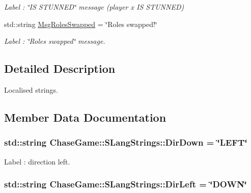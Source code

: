 \begin{DoxyCompactItemize}
\begin{DoxyCompactList}\small\item\em Label \-: \char`\"{}\-I\-S S\-T\-U\-N\-N\-E\-D\char`\"{} message (player x I\-S S\-T\-U\-N\-N\-E\-D) \end{DoxyCompactList}\item 
std\-::string \hyperlink{struct_chase_game_1_1_s_lang_strings_a7218940577aeae4cfb5f47bda05c88ce}{Msg\-Roles\-Swapped} = \char`\"{}Roles swapped!\char`\"{}
\begin{DoxyCompactList}\small\item\em Label \-: \char`\"{}\-Roles swapped\char`\"{} message. \end{DoxyCompactList}\end{DoxyCompactItemize}


\subsection{Detailed Description}
Localised strings. 

\subsection{Member Data Documentation}
\hypertarget{struct_chase_game_1_1_s_lang_strings_acdb25c93c1bfd59df237ea8a9d3c1dff}{
\subsubsection[{Dir\-Down}]{\setlength{\rightskip}{0pt plus 5cm}std\-::string Chase\-Game\-::\-S\-Lang\-Strings\-::\-Dir\-Down = \char`\"{}L\-E\-F\-T\char`\"{}}}\label{struct_chase_game_1_1_s_lang_strings_acdb25c93c1bfd59df237ea8a9d3c1dff}


Label \-: direction left. 

\hypertarget{struct_chase_game_1_1_s_lang_strings_a4ca93fbfa4edbcc41c95bd1063e6e334}{
\subsubsection[{Dir\-Left}]{\setlength{\rightskip}{0pt plus 5cm}std\-::string Chase\-Game\-::\-S\-Lang\-Strings\-::\-Dir\-Left = \char`\"{}D\-O\-W\-N\char`\"{}}}\label{struct_chase_game_1_1_s_lang_strings_a4ca93fbfa4edbcc41c95bd1063e6e334}


